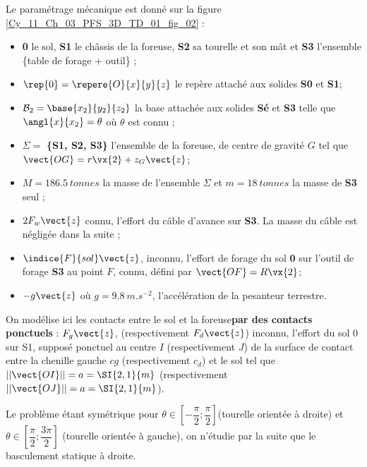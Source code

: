 Le paramétrage mécanique est donné sur la figure \ref{Cy_11_Ch_03_PFS_3D_TD_01_fig_02} : 
\begin{itemize}
\item \textbf{0} le sol, \textbf{S1} le châssis de la foreuse, \textbf{S2} sa tourelle et son mât et \textbf{S3} l’ensemble \{table de forage + outil\} ; 
\item $\rep{0} = \repere{O}{x}{y}{z}$ le repère attaché aux solides \textbf{S0} et \textbf{S1}; 
\item $\mathcal{B}_2=\base{x_2}{y_2}{z_2}$ la base attachée aux solides \textbf{Sé} et \textbf{S3} telle que $\angl{x}{x_2}=\theta$ où $\theta$ est connu ;
\item $\Sigma = $ \textbf{\{S1, S2, S3\}} l’ensemble de la foreuse, de centre de gravité $G$ tel que $\vect{OG} = r \vx{2} +  z_G \vect{z}$;
\item $M = \SI{186,5}{tonnes}$ la masse de l’ensemble $\Sigma$ et $m =\SI{18}{tonnes}$ la masse de \textbf{S3} seul ; 
\item $2F_w \vect{z}$ connu, l’effort du câble d’avance sur \textbf{S3}. La masse du câble est négligée dans la suite ; 
\item $\indice{F}{sol}\vect{z}$, inconnu, l’effort de forage du sol \textbf{0} sur l’outil de forage \textbf{S3} au point $F$, connu, défini par $\vect{OF}=R\vx{2}$;
\item $-g\vect{z}$  où $g = \SI{9,8}{m.s^{-2}}$, l’accélération de la pesanteur terrestre.
\end{itemize}

On modélise ici les contacts entre le sol et la foreuse\textbf{par des contacts ponctuels}  :
$F_g \vect{z}$, (respectivement  $F_d \vect{z}$) inconnu, l’effort du sol 0 sur S1, supposé ponctuel au centre $I$ (respectivement  $J$) de la surface de contact entre la chenille gauche $cg$ (respectivement  $c_d$) et le sol tel que $||\vect{OI}|| = a=\SI{2,1}{m}$ (respectivement  $||\vect{OJ}|| = a=\SI{2,1}{m}$).



Le problème étant symétrique pour $\theta \in \left[-\dfrac{\pi}{2};\dfrac{\pi}{2}\right]$(tourelle orientée à droite) et $\theta \in \left[\dfrac{\pi}{2};\dfrac{3\pi}{2}\right]$ (tourelle orientée à gauche), on n’étudie par la suite que le basculement statique à droite. 

